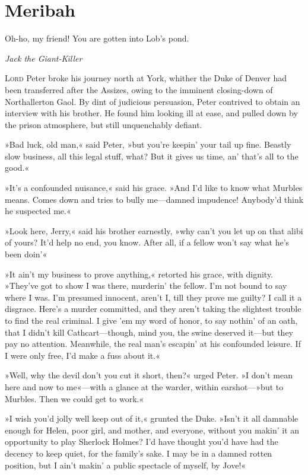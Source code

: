 
\chapter{Meribah}

\epigraph{Oh-ho, my friend! You are gotten into Lob's pond.}{\textit{Jack the Giant-Killer}}


\lettrine[lines=4]{L}{ord} Peter broke his journey north at York, whither the Duke of Denver had been transferred after the Assizes, owing to the imminent closing-down of Northallerton Gaol. By dint of judicious persuasion, Peter contrived to obtain an interview with his brother. He found him looking ill at ease, and pulled down by the prison atmosphere, but still unquenchably defiant.

»Bad luck, old man,« said Peter, »but you're keepin' your tail up fine. Beastly slow business, all this legal stuff, what? But it gives us time, an' that's all to the good.«

»It's a confounded nuisance,« said his grace. »And I'd like to know what Murbles means. Comes down and tries to bully me\allowbreak---\allowbreak damned impudence! Anybody'd think he suspected me.«

»Look here, Jerry,« said his brother earnestly, »why can't you let up on that alibi of yours? It'd help no end, you know. After all, if a fellow won't say what he's been doin'\longdash«

»It ain't my business to prove anything,« retorted his grace, with dignity. »They've got to show I was there, murderin' the fellow. I'm not bound to say where I was. I'm presumed innocent, aren't I, till they prove me guilty? I call it a disgrace. Here's a murder committed, and they aren't taking the slightest trouble to find the real criminal. I give 'em my word of honor, to say nothin' of an oath, that I didn't kill Cathcart\allowbreak---\allowbreak though, mind you, the swine deserved it\allowbreak---\allowbreak but they pay no attention. Meanwhile, the real man's escapin' at his confounded leisure. If I were only free, I'd make a fuss about it.«

»Well, why the devil don't you cut it short, then?« urged Peter. »I don't mean here and now to me«---with a glance at the warder, within earshot---»but to Murbles. Then we could get to work.«

»I wish you'd jolly well keep out of it,« grunted the Duke. »Isn't it all damnable enough for Helen, poor girl, and mother, and everyone, without you makin' it an opportunity to play Sherlock Holmes? I'd have thought you'd have had the decency to keep quiet, for the family's sake. I may be in a damned rotten position, but I ain't makin' a public spectacle of myself, by Jove!«

